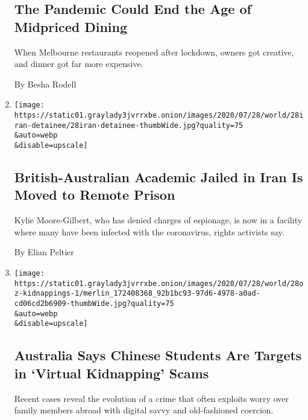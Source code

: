 \begin{enumerate}
{  \subsection{The Pandemic Could End the Age of Midpriced
  Dining}\label{the-pandemic-could-end-the-age-of-midpriced-dining}}

  When Melbourne restaurants reopened after lockdown, owners got
  creative, and dinner got far more expensive.

  By Besha Rodell
\item
  \href{/2020/07/28/world/europe/british-australian-academic-jail-iran-qarchak.html}{}

  \texttt{[image: https://static01.graylady3jvrrxbe.onion/images/2020/07/28/world/28iran-detainee/28iran-detainee-thumbWide.jpg?quality=75\\\&auto=webp\\\&disable=upscale]}

  \hypertarget{british-australian-academic-jailed-in-iran-is-moved-to-remote-prison}{%
  \subsection{British-Australian Academic Jailed in Iran Is Moved to
  Remote
  Prison}\label{british-australian-academic-jailed-in-iran-is-moved-to-remote-prison}}

  Kylie Moore-Gilbert, who has denied charges of espionage, is now in a
  facility where many have been infected with the coronavirus, rights
  activists say.

  By Elian Peltier
\item
  \href{/2020/07/28/world/australia/chinese-students-virtual-kidnapping.html}{}

  \texttt{[image: https://static01.graylady3jvrrxbe.onion/images/2020/07/28/world/28oz-kidnappings-1/merlin\_172408368\_92b1bc93-97d6-4978-a0ad-cd06cd2b6909-thumbWide.jpg?quality=75\\\&auto=webp\\\&disable=upscale]}

  \hypertarget{australia-says-chinese-students-are-targets-in-virtual-kidnapping-scams}{%
  \subsection{Australia Says Chinese Students Are Targets in `Virtual
  Kidnapping'
  Scams}\label{australia-says-chinese-students-are-targets-in-virtual-kidnapping-scams}}

  Recent cases reveal the evolution of a crime that often exploits worry
  over family members abroad with digital savvy and old-fashioned
  coercion.


\end{enumerate}
